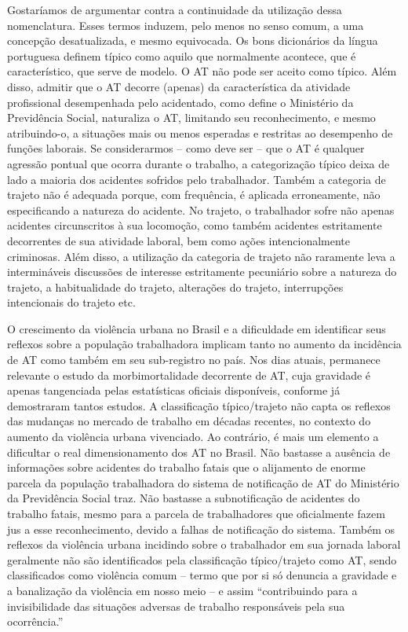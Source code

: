 Gostaríamos de argumentar contra a continuidade da utilização dessa nomenclatura. Esses termos induzem, pelo menos no senso comum, a uma concepção desatualizada, e mesmo equivocada. Os bons dicionários da língua portuguesa definem típico como aquilo que normalmente acontece, que é característico, que serve de modelo. O AT não pode ser aceito como típico. Além disso, admitir que o AT decorre (apenas) da característica da atividade profissional desempenhada pelo acidentado, como define o Ministério da Previdência Social, naturaliza o AT, limitando seu reconhecimento, e mesmo atribuindo-o, a situações mais ou menos esperadas e restritas ao desempenho de funções laborais. Se considerarmos – como deve ser – que o AT é qualquer agressão pontual que ocorra durante o trabalho, a categorização típico deixa de lado a maioria dos acidentes sofridos pelo trabalhador. Também a categoria de trajeto não é adequada porque, com frequência, é aplicada erroneamente, não especificando a natureza do acidente. No trajeto, o trabalhador sofre não apenas acidentes circunscritos à sua locomoção, como também acidentes estritamente decorrentes de sua atividade laboral, bem como ações intencionalmente criminosas. Além disso, a utilização da categoria de trajeto não raramente leva a intermináveis discussões de interesse estritamente pecuniário sobre a natureza do trajeto, a habitualidade do trajeto, alterações do trajeto, interrupções intencionais do trajeto etc.

O crescimento da violência urbana no Brasil e a dificuldade em identificar seus reflexos sobre a população trabalhadora implicam tanto no aumento da incidência de AT como também em seu sub-registro no país. Nos dias atuais, permanece relevante o estudo da morbimortalidade decorrente de AT, cuja gravidade é apenas tangenciada pelas estatísticas oficiais disponíveis, conforme já demostraram tantos estudos. A classificação típico/trajeto não capta os reflexos das mudanças no mercado de trabalho em décadas recentes, no contexto do aumento da violência urbana vivenciado. Ao contrário, é mais um elemento a dificultar o real dimensionamento dos AT no Brasil. Não bastasse a ausência de informações sobre acidentes do trabalho fatais que o alijamento de enorme parcela da população trabalhadora do sistema de notificação de AT do Ministério da Previdência Social traz. Não bastasse a subnotificação de acidentes do trabalho fatais, mesmo para a parcela de trabalhadores que oficialmente fazem jus a esse reconhecimento, devido a falhas de notificação do sistema. Também os reflexos da violência urbana incidindo sobre o trabalhador em sua jornada laboral geralmente não são identificados pela classificação típico/trajeto como AT, sendo classificados como violência comum – termo que por si só denuncia a gravidade e a banalização da violência em nosso meio – e assim “contribuindo para a invisibilidade das situações adversas de trabalho responsáveis pela sua ocorrência.” \citep[p. 128]{lacerda2014visibilidade}

